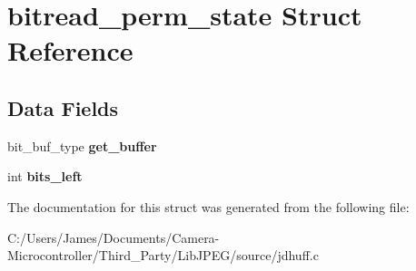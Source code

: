 \hypertarget{structbitread__perm__state}{}\section{bitread\+\_\+perm\+\_\+state Struct Reference}
\label{structbitread__perm__state}
\subsection*{Data Fields}
\begin{DoxyCompactItemize}
\item 
\mbox{\label{structbitread__perm__state_a9bcfab076ba6e1ababeab060af4e3462}} 
bit\+\_\+buf\+\_\+type {\bfseries get\+\_\+buffer}
\item 
\mbox{\label{structbitread__perm__state_aa41e533cd200843c1653b1b9e7285152}} 
int {\bfseries bits\+\_\+left}
\end{DoxyCompactItemize}


The documentation for this struct was generated from the following file\+:\begin{DoxyCompactItemize}
\item 
C\+:/\+Users/\+James/\+Documents/\+Camera-\/\+Microcontroller/\+Third\+\_\+\+Party/\+Lib\+J\+P\+E\+G/source/jdhuff.\+c\end{DoxyCompactItemize}
